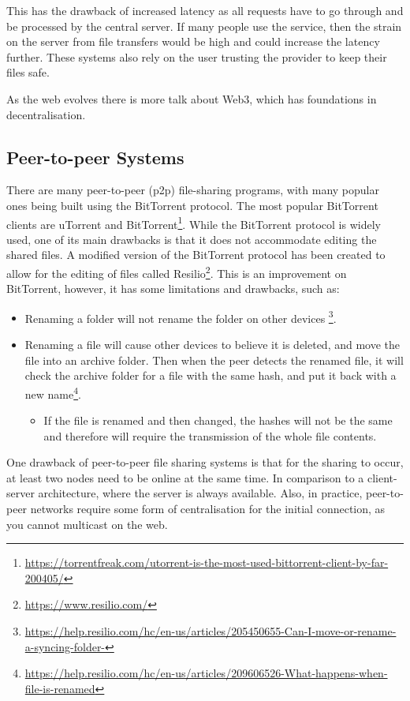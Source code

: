 \documentclass[12pt]{report}
\begin{document}
This has the drawback of increased latency as all requests have to go through and be processed by the central server. If many people use the service, then the strain on the server from file transfers would be high and could increase the latency further. These systems also rely on the user trusting the provider to keep their files safe. \par

As the web evolves there is more talk about Web3\cite{WhatIsWeb3}, which has foundations in decentralisation.
\subsection{Peer-to-peer Systems}
There are many peer-to-peer (p2p) file-sharing programs, with many popular ones being built using the BitTorrent protocol. The most popular BitTorrent clients are uTorrent and BitTorrent\footnote{\url{https://torrentfreak.com/utorrent-is-the-most-used-bittorrent-client-by-far-200405/}}. While the BitTorrent protocol is widely used, one of its main drawbacks is that it does not accommodate editing the shared files. A modified version of the  BitTorrent protocol has been created to allow for the editing of files called Resilio\footnote{\url{https://www.resilio.com/}}. This is an improvement on BitTorrent, however, it has some limitations and drawbacks, such as:
\begin{itemize}
    \item Renaming a folder will not rename the folder on other devices \footnote{\url{https://help.resilio.com/hc/en-us/articles/205450655-Can-I-move-or-rename-a-syncing-folder-}}.
    \item Renaming a file will cause other devices to believe it is deleted, and move the file into an archive folder. Then when the peer detects the renamed file, it will check the archive folder for a file with the same hash, and put it back with a new name\footnote{\url{https://help.resilio.com/hc/en-us/articles/209606526-What-happens-when-file-is-renamed}}.
          \begin{itemize}
              \item If the file is renamed and then changed, the hashes will not be the same and therefore will require the transmission of the whole file contents.
          \end{itemize}
\end{itemize}  \par
One drawback of peer-to-peer file sharing systems is that for the sharing to occur, at least two nodes need to be online at the same time. In comparison to a client-server architecture, where the server is always available. Also, in practice, peer-to-peer networks require some form of centralisation for the initial connection, as you cannot multicast on the web.
\end{document}
